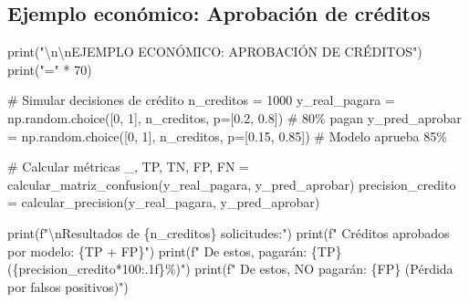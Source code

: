\documentclass[
  doc,
  floatsintext,
  longtable,
  a4paper,
  nolmodern,
  notxfonts,
  notimes,
  12pt,
  colorlinks=true,linkcolor=blue,citecolor=blue,urlcolor=blue]{apa7}
\newenvironment{Shaded}{\begin{snugshade}}{\end{snugshade}}
\newcommand{\BuiltInTok}[1]{\textcolor[rgb]{0.00,0.23,0.31}{#1}}
\newcommand{\CharTok}[1]{\textcolor[rgb]{0.13,0.47,0.30}{#1}}
\newcommand{\CommentTok}[1]{\textcolor[rgb]{0.37,0.37,0.37}{#1}}
\newcommand{\DecValTok}[1]{\textcolor[rgb]{0.68,0.00,0.00}{#1}}
\newcommand{\FloatTok}[1]{\textcolor[rgb]{0.68,0.00,0.00}{#1}}
\newcommand{\NormalTok}[1]{\textcolor[rgb]{0.00,0.23,0.31}{#1}}
\newcommand{\OperatorTok}[1]{\textcolor[rgb]{0.37,0.37,0.37}{#1}}
\newcommand{\SpecialCharTok}[1]{\textcolor[rgb]{0.37,0.37,0.37}{#1}}
\newcommand{\SpecialStringTok}[1]{\textcolor[rgb]{0.13,0.47,0.30}{#1}}
\newcommand{\StringTok}[1]{\textcolor[rgb]{0.13,0.47,0.30}{#1}}
\begin{document}
\subsection{Ejemplo económico: Aprobación de
créditos}\label{ejemplo-econuxf3mico-aprobaciuxf3n-de-cruxe9ditos}

\begin{Shaded}
\begin{Highlighting}[]
\BuiltInTok{print}\NormalTok{(}\StringTok{"}\CharTok{\textbackslash{}n\textbackslash{}n}\StringTok{EJEMPLO ECONÓMICO: APROBACIÓN DE CRÉDITOS"}\NormalTok{)}
\BuiltInTok{print}\NormalTok{(}\StringTok{"="} \OperatorTok{*} \DecValTok{70}\NormalTok{)}

\CommentTok{\# Simular decisiones de crédito}
\NormalTok{n\_creditos }\OperatorTok{=} \DecValTok{1000}
\NormalTok{y\_real\_pagara }\OperatorTok{=}\NormalTok{ np.random.choice([}\DecValTok{0}\NormalTok{, }\DecValTok{1}\NormalTok{], n\_creditos, p}\OperatorTok{=}\NormalTok{[}\FloatTok{0.2}\NormalTok{, }\FloatTok{0.8}\NormalTok{])  }\CommentTok{\# 80\% pagan}
\NormalTok{y\_pred\_aprobar }\OperatorTok{=}\NormalTok{ np.random.choice([}\DecValTok{0}\NormalTok{, }\DecValTok{1}\NormalTok{], n\_creditos, p}\OperatorTok{=}\NormalTok{[}\FloatTok{0.15}\NormalTok{, }\FloatTok{0.85}\NormalTok{])  }\CommentTok{\# Modelo aprueba 85\%}

\CommentTok{\# Calcular métricas}
\NormalTok{\_, TP, TN, FP, FN }\OperatorTok{=}\NormalTok{ calcular\_matriz\_confusion(y\_real\_pagara, y\_pred\_aprobar)}
\NormalTok{precision\_credito }\OperatorTok{=}\NormalTok{ calcular\_precision(y\_real\_pagara, y\_pred\_aprobar)}

\BuiltInTok{print}\NormalTok{(}\SpecialStringTok{f"}\CharTok{\textbackslash{}n}\SpecialStringTok{Resultados de }\SpecialCharTok{\{}\NormalTok{n\_creditos}\SpecialCharTok{\}}\SpecialStringTok{ solicitudes:"}\NormalTok{)}
\BuiltInTok{print}\NormalTok{(}\SpecialStringTok{f"  Créditos aprobados por modelo: }\SpecialCharTok{\{}\NormalTok{TP }\OperatorTok{+}\NormalTok{ FP}\SpecialCharTok{\}}\SpecialStringTok{"}\NormalTok{)}
\BuiltInTok{print}\NormalTok{(}\SpecialStringTok{f"  De estos, pagarán: }\SpecialCharTok{\{}\NormalTok{TP}\SpecialCharTok{\}}\SpecialStringTok{ (}\SpecialCharTok{\{}\NormalTok{precision\_credito}\OperatorTok{*}\DecValTok{100}\SpecialCharTok{:.1f\}}\SpecialStringTok{\%)"}\NormalTok{)}
\BuiltInTok{print}\NormalTok{(}\SpecialStringTok{f"  De estos, NO pagarán: }\SpecialCharTok{\{}\NormalTok{FP}\SpecialCharTok{\}}\SpecialStringTok{ (Pérdida por falsos positivos)"}\NormalTok{)}


\end{Highlighting}
\end{Shaded}
\end{document}
